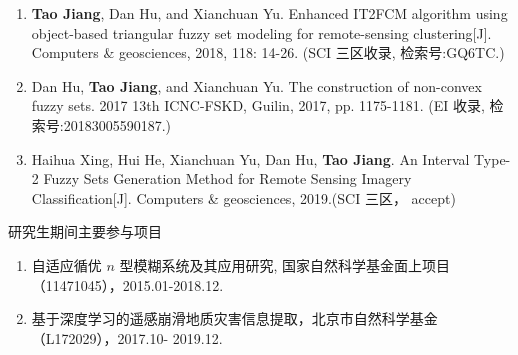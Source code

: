 \begin{paper}
\begin{enumerate}
  \item \textbf{Tao Jiang}, Dan Hu, and Xianchuan Yu.  Enhanced IT2FCM algorithm using object-based triangular fuzzy set modeling for remote-sensing clustering[J]. Computers \& geosciences, 2018, 118: 14-26. (SCI 三区收录, 检索号:GQ6TC.)
  \item Dan Hu, \textbf{Tao Jiang}, and Xianchuan Yu. The construction of non-convex fuzzy sets. 2017 13th ICNC-FSKD, Guilin, 2017, pp. 1175-1181. (EI 收录, 检索号:20183005590187.)
  \item Haihua Xing, Hui He, Xianchuan Yu, Dan Hu, \textbf{Tao Jiang}.  An Interval Type-2 Fuzzy Sets Generation Method for Remote Sensing Imagery Classification[J]. Computers \& geosciences, 2019.(SCI 三区， accept)\\

  \end{enumerate}

\end{paper}





\begin{center}
  \large {\hei 研究生期间主要参与项目 }
\end{center}

\begin{enumerate}[(1)]
\item 自适应循优 $n$ 型模糊系统及其应用研究, 国家自然科学基金面上项目（11471045），2015.01-2018.12.

\item 基于深度学习的遥感崩滑地质灾害信息提取，北京市自然科学基金（L172029），2017.10-
2019.12.\\

\end{enumerate}

